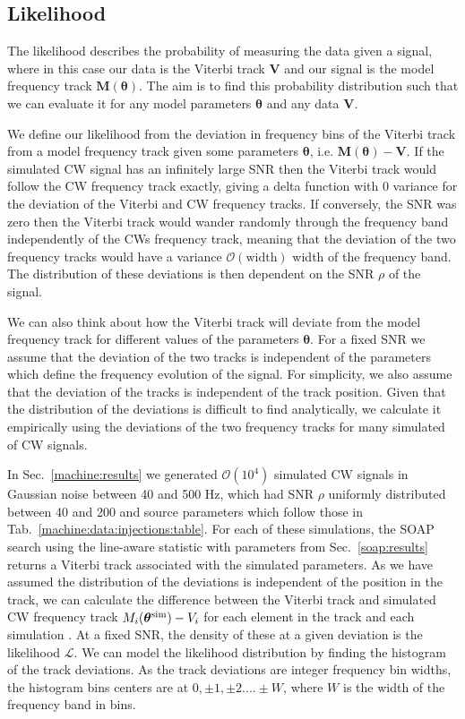 %
%
\subsection{\label{par_est:bayes:likelihood}Likelihood}
%
%

The likelihood describes the probability of measuring the data
given a signal, where in this case our data is the Viterbi track $\bm{V}$ and
our signal is the model frequency track $\bm{M}(\bm{\theta})$.  The aim is to
find this probability distribution such that we can evaluate it for any model
parameters $\bm{\theta}$ and any data $\bm{V}$.

We define our likelihood from the deviation in frequency bins of the Viterbi
track from a model frequency track given some parameters $\bm{\theta}$, i.e.
$\bm{M}(\bm{\theta}) - \bm{V}$.  If the simulated \gls{CW} signal has an
infinitely large \gls{SNR} then the Viterbi track would follow the \gls{CW}
frequency track exactly, giving a delta function with 0 variance for the
deviation of the Viterbi and \gls{CW} frequency tracks. If conversely, the \gls{SNR} was zero
then the Viterbi track would wander randomly through the frequency band
independently of the \glspl{CW} frequency track, meaning that the deviation of
the two frequency tracks would have a variance $\mathcal{O}(\text{width})$
width of the
frequency band.  The distribution of these deviations is then dependent on the
\gls{SNR} $\rho$ of the signal.  

We can also think about how the Viterbi track will deviate from the model frequency track for different values of the parameters $\bm{\theta}$.
For a fixed \gls{SNR} we assume that the deviation of the two tracks is independent of the parameters which define the frequency evolution of the signal. 
For simplicity, we also assume that the deviation of the tracks is independent of the track position.
Given that the distribution of the deviations is difficult to find analytically, we calculate it empirically using the deviations of the two frequency tracks for many simulated of \gls{CW} signals. 

In Sec.~\ref{machine:results} we generated $\mathcal{O}(10^{4})$ simulated
\gls{CW} signals in Gaussian noise between 40 and 500 Hz, which had \gls{SNR}
$\rho$ uniformly distributed between 40 and 200 and
source parameters which follow those in
Tab.~\ref{machine:data:injections:table}. For each of these simulations, the
SOAP search using the line-aware statistic with parameters from
Sec.~\ref{soap:results} returns a Viterbi track associated with the simulated
parameters.  As we have assumed the distribution of the deviations is independent of the position in the track, we can calculate the difference between the Viterbi track and simulated \gls{CW} frequency track $M_i(\bm{\theta}^{\rm{sim}}) - V_i$ for each
element in the track and each simulation .
At a fixed \gls{SNR}, the density of these at a given deviation is the likelihood $\mathcal{L}$. 
We can model the likelihood distribution by finding the histogram of the track deviations.  As the track deviations are
integer frequency bin widths, the histogram bins centers are at $0, \pm 1, \pm 2 .... \pm W$, where $W$ is the width of the frequency band
in bins.

